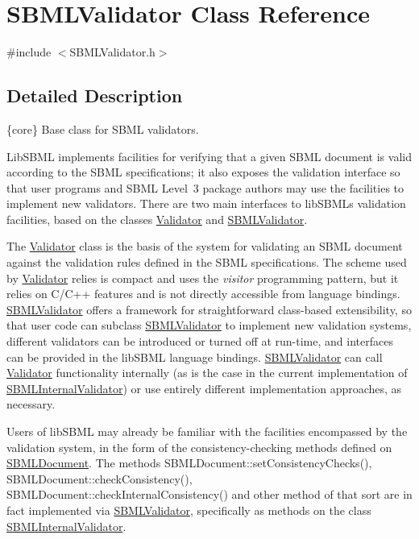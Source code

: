 \hypertarget{class_s_b_m_l_validator}{}\section{S\+B\+M\+L\+Validator Class Reference}
\label{class_s_b_m_l_validator}


{\ttfamily \#include $<$S\+B\+M\+L\+Validator.\+h$>$}



\subsection{Detailed Description}
\{core\} Base class for S\+B\+ML validators.



Lib\+S\+B\+ML implements facilities for verifying that a given S\+B\+ML document is valid according to the S\+B\+ML specifications; it also exposes the validation interface so that user programs and S\+B\+ML Level~3 package authors may use the facilities to implement new validators. There are two main interfaces to lib\+S\+B\+ML\textquotesingle{}s validation facilities, based on the classes \hyperlink{class_validator}{Validator} and \hyperlink{class_s_b_m_l_validator}{S\+B\+M\+L\+Validator}.

The \hyperlink{class_validator}{Validator} class is the basis of the system for validating an S\+B\+ML document against the validation rules defined in the S\+B\+ML specifications. The scheme used by \hyperlink{class_validator}{Validator} relies is compact and uses the {\itshape visitor} programming pattern, but it relies on C/\+C++ features and is not directly accessible from language bindings. \hyperlink{class_s_b_m_l_validator}{S\+B\+M\+L\+Validator} offers a framework for straightforward class-\/based extensibility, so that user code can subclass \hyperlink{class_s_b_m_l_validator}{S\+B\+M\+L\+Validator} to implement new validation systems, different validators can be introduced or turned off at run-\/time, and interfaces can be provided in the lib\+S\+B\+ML language bindings. \hyperlink{class_s_b_m_l_validator}{S\+B\+M\+L\+Validator} can call \hyperlink{class_validator}{Validator} functionality internally (as is the case in the current implementation of \hyperlink{class_s_b_m_l_internal_validator}{S\+B\+M\+L\+Internal\+Validator}) or use entirely different implementation approaches, as necessary.

Users of lib\+S\+B\+ML may already be familiar with the facilities encompassed by the validation system, in the form of the consistency-\/checking methods defined on \hyperlink{class_s_b_m_l_document}{S\+B\+M\+L\+Document}. The methods S\+B\+M\+L\+Document\+::set\+Consistency\+Checks(), S\+B\+M\+L\+Document\+::check\+Consistency(), S\+B\+M\+L\+Document\+::check\+Internal\+Consistency() and other method of that sort are in fact implemented via \hyperlink{class_s_b_m_l_validator}{S\+B\+M\+L\+Validator}, specifically as methods on the class \hyperlink{class_s_b_m_l_internal_validator}{S\+B\+M\+L\+Internal\+Validator}.

